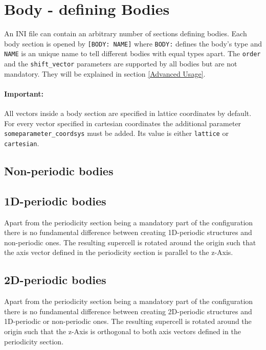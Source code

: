 \section{Body - defining Bodies}

An INI file can contain an arbitrary number of sections defining bodies. Each body section is opened by \lstinline{[BODY: NAME]} where \lstinline{BODY:} defines the body's type and \lstinline{NAME} is an unique name to tell different bodies with equal types apart. The \lstinline{order} and the \lstinline{shift_vector} parameters are supported by all bodies but are not mandatory. They will be explained in section \ref{Advanced Usage}. %

\paragraph{Important:} All vectors inside a body section are specified in lattice coordinates by default. For every vector specified in cartesian coordinates the additional parameter \lstinline{someparameter_coordsys} must be added. Its value is either \lstinline{lattice} or \lstinline{cartesian}.

\subsection{Non-periodic bodies}



\subsection{1D-periodic bodies}
Apart from the periodicity section being a mandatory part of the configuration there is no fundamental difference between creating 1D-periodic structures and non-periodic ones. The resulting supercell is rotated around the origin such that the axis vector defined in the periodicity section is parallel to the z-Axis.




\subsection{2D-periodic bodies}

Apart from the periodicity section being a mandatory part of the configuration there is no fundamental difference between creating 2D-periodic structures and 1D-periodic or non-periodic ones. The resulting supercell is rotated around the origin such that the z-Axis is orthogonal to both axis vectors defined in the periodicity section.


